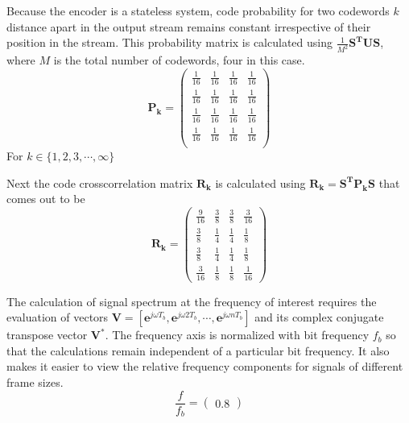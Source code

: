 Because the encoder is a stateless system, code probability for two codewords $k$ distance apart in the output stream remains constant irrespective of their position in the stream.  This probability matrix is calculated using $\frac{1}{M^2} \mathbf{S^T U S}$, where $M$ is the total number of codewords, four in this case.
\begin{equation}
\mathbf{P_k}=
	\begin{pmatrix}
	     \frac{1}{16}&\frac{1}{16}&\frac{1}{16}&\frac{1}{16}\\
	     \frac{1}{16}&\frac{1}{16}&\frac{1}{16}&\frac{1}{16}\\
	     \frac{1}{16}&\frac{1}{16}&\frac{1}{16}&\frac{1}{16}\\
	     \frac{1}{16}&\frac{1}{16}&\frac{1}{16}&\frac{1}{16}\\
	\end{pmatrix}
\end{equation}
For ${k}\in \{1,2,3,\cdots,\infty \}$

Next the code crosscorrelation matrix $\mathbf{R_k}$ is calculated using $\mathbf{R_k=S^T P_k S }$ that comes out to be
\begin{equation}
\mathbf{R_k}=
	\begin{pmatrix}
	     \frac{9}{16}&\frac{3}{8}&\frac{3}{8}&\frac{3}{16} \\
	     \frac{3}{8}  &\frac{1}{4}&\frac{1}{4}&\frac{1}{8} \\
	     \frac{3}{8}  &\frac{1}{4}&\frac{1}{4}&\frac{1}{8} \\
	     \frac{3}{16} &\frac{1}{8}&\frac{1}{8}&\frac{1}{16} 
	\end{pmatrix}
\end{equation}

The calculation of signal spectrum at the frequency of interest requires the evaluation of vectors $\mathbf{V}=\left[\mathbf{e}^{j\omega T_b}, \mathbf{e}^{j\omega 2T_b}, \cdots,\mathbf{e}^{j\omega nT_b}\right]$ and its complex conjugate transpose vector $\mathbf{V^*}$. The frequency axis is normalized with bit frequency $f_b$ so that the calculations remain independent of a particular bit frequency. It also makes it easier to view the relative frequency components for signals of different frame sizes. \begin{equation}
	{\frac{f}{f_b}}=
	\begin{pmatrix}
	0.8
	\end{pmatrix}
	\label{eq:freq}
\end{equation}

